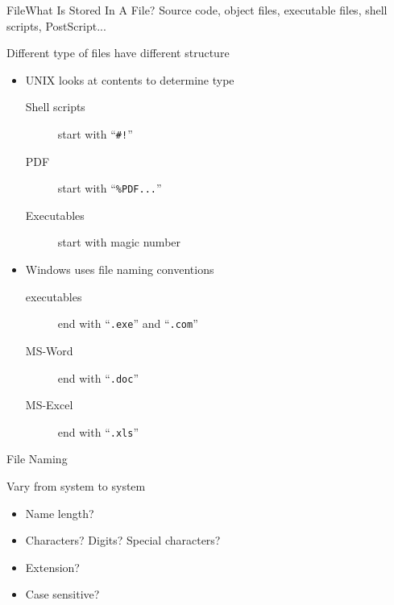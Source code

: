 \begin{frame}{File}{What Is Stored In A File?}
  Source code, object files, executable files, shell scripts, PostScript...
  \begin{block}{Different type of files have different structure}
    \begin{itemize}
    \item UNIX looks at contents to determine type
      \begin{description}
      \item[Shell scripts] start with ``\texttt{\#!}''
      \item[PDF] start with ``\texttt{\%PDF...}''
      \item[Executables] start with \alert{magic number}
      \end{description}
    \item Windows uses file naming conventions
      \begin{description}
      \item[executables] end with ``\texttt{.exe}'' and ``\texttt{.com}''
      \item[MS-Word] end with ``\texttt{.doc}''
      \item[MS-Excel] end with ``\texttt{.xls}''
      \end{description}
    \end{itemize}
  \end{block}
\end{frame}

\begin{frame}{File Naming}
  \begin{block}{Vary from system to system}
  \begin{itemize}
  \item Name length?
  \item Characters? Digits? Special characters?
  \item Extension?
  \item Case sensitive?
  \end{itemize}    
  \end{block}
\end{frame}

